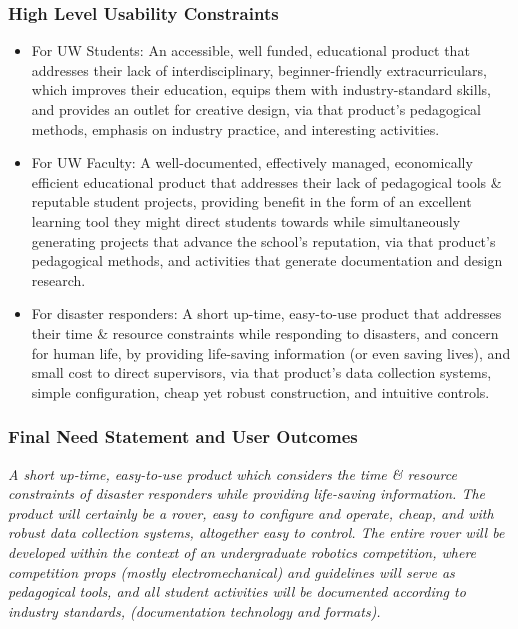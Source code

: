 \documentclass[a4paper, 10pt]{article}
\begin{document}
		\subsubsection{High Level Usability Constraints}
			\begin{itemize}
			\item 
			For UW Students: An accessible, well funded, educational product that addresses their lack of interdisciplinary, beginner-friendly extracurriculars, which improves their education, equips them with industry-standard skills, and provides an outlet for creative design, via that product's pedagogical methods, emphasis on industry practice, and interesting activities. 
		
			\item		
			For UW Faculty: A well-documented, effectively managed, economically efficient educational product that addresses their lack of pedagogical tools \& reputable student projects, providing benefit in the form of an excellent learning tool they might direct students towards while simultaneously generating projects that advance the school's reputation, via that product's pedagogical methods, and activities that generate documentation and design research. 
		
			\item
			For disaster responders: A short up-time, easy-to-use product that addresses their time \& resource constraints while responding to disasters, and concern for human life, by providing life-saving information (or even saving lives), and small cost to direct supervisors, via that product's data collection systems, simple configuration, cheap yet robust construction, and intuitive controls.	
			\end{itemize}

		\subsubsection{Final Need Statement and User Outcomes}
		\textit{A short up-time, easy-to-use product which considers the time \& resource constraints of disaster responders while providing life-saving information. The product will certainly be a rover, easy to configure and operate, cheap, and with robust data collection systems, altogether easy to control. The entire rover will be developed within the context of an undergraduate robotics competition, where competition props (mostly electromechanical) and guidelines will serve as pedagogical tools, and all student activities will be documented according to industry standards, (documentation technology and formats).}
	
\end{document}
